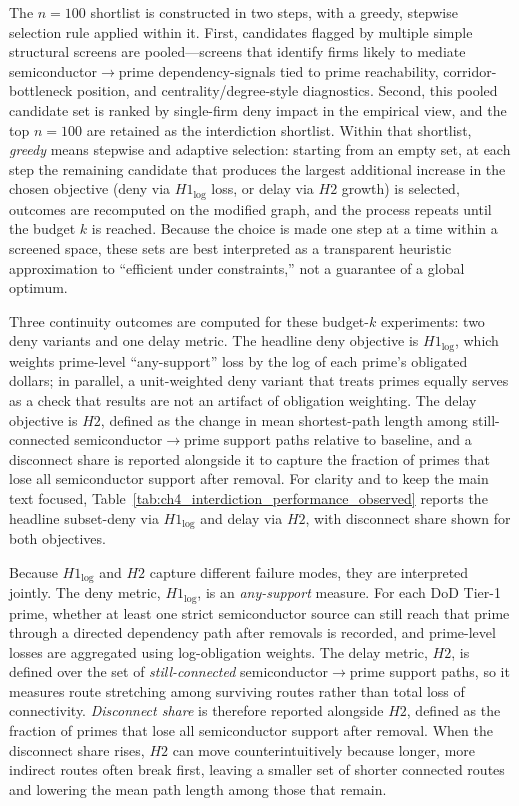 The $n=100$ shortlist is constructed in two steps, with a greedy, stepwise selection rule applied within it. First, candidates flagged by multiple simple structural screens are pooled---screens that identify firms likely to mediate semiconductor$\rightarrow$prime dependency-signals tied to prime reachability, corridor-bottleneck position, and centrality/degree-style diagnostics. Second, this pooled candidate set is ranked by single-firm deny impact in the empirical view, and the top $n=100$ are retained as the interdiction shortlist. Within that shortlist, \emph{greedy} means stepwise and adaptive selection: starting from an empty set, at each step the remaining candidate that produces the largest additional increase in the chosen objective (deny via $H1_{\log}$ loss, or delay via $H2$ growth) is selected, outcomes are recomputed on the modified graph, and the process repeats until the budget $k$ is reached. Because the choice is made one step at a time within a screened space, these sets are best interpreted as a transparent heuristic approximation to ``efficient under constraints,'' not a guarantee of a global optimum.

Three continuity outcomes are computed for these budget-$k$ experiments: two deny variants and one delay metric. The headline deny objective is $H1_{\log}$, which weights prime-level ``any-support'' loss by the log of each prime's obligated dollars; in parallel, a unit-weighted deny variant that treats primes equally serves as a check that results are not an artifact of obligation weighting. The delay objective is $H2$, defined as the change in mean shortest-path length among still-connected semiconductor$\rightarrow$prime support paths relative to baseline, and a disconnect share is reported alongside it to capture the fraction of primes that lose all semiconductor support after removal. For clarity and to keep the main text focused, Table~\ref{tab:ch4_interdiction_performance_observed} reports the headline subset-deny via $H1_{\log}$ and delay via $H2$, with disconnect share shown for both objectives.

Because $H1_{\log}$ and $H2$ capture different failure modes, they are interpreted jointly. The deny metric, $H1_{\log}$, is an \emph{any-support} measure. For each DoD Tier-1 prime, whether at least one strict semiconductor source can still reach that prime through a directed dependency path after removals is recorded, and prime-level losses are aggregated using log-obligation weights. The delay metric, $H2$, is defined over the set of \emph{still-connected} semiconductor$\rightarrow$prime support paths, so it measures route stretching among surviving routes rather than total loss of connectivity. \emph{Disconnect share} is therefore reported alongside $H2$, defined as the fraction of primes that lose all semiconductor support after removal. When the disconnect share rises, $H2$ can move counterintuitively because longer, more indirect routes often break first, leaving a smaller set of shorter connected routes and lowering the mean path length among those that remain.

